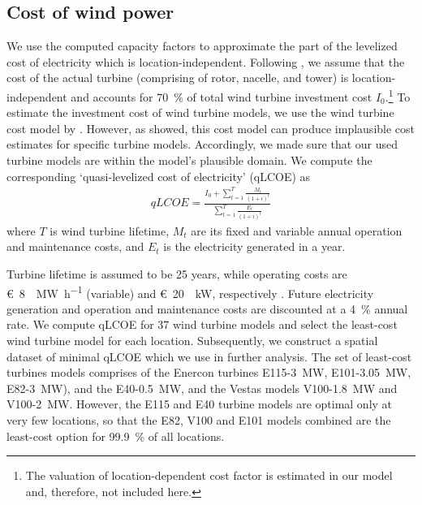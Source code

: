\documentclass[review, a4paper, 12pt, authoryear, times]{elsarticle}
\begin{document}
\subsection{Cost of wind power}\label{app:qlcoe}
We use the computed capacity factors to approximate the part of the levelized cost of electricity which is location-independent.
Following \cite{Eberle2019}, we assume that the cost of the actual turbine (comprising of rotor, nacelle, and tower) is location-independent and accounts for \SI{70}{\percent} of total wind turbine investment cost $I_0$.\footnote{The valuation of location-dependent cost factor is estimated in our model and, therefore, not included here.}
To estimate the investment cost of wind turbine models, we use the wind turbine cost model by \cite{Rinne2018}.
However, as \cite{Kloeckl2022} showed, this cost model can produce implausible cost estimates for specific turbine models.
Accordingly, we made sure that our used turbine models are within the model's plausible domain.
We compute the corresponding `quasi-levelized cost of electricity' (qLCOE) as
\begin{align}
    qLCOE = \frac{I_0 + \sum_{t=1}^{T} \frac{M_t}{(1+i)^t}}{\sum_{t=1}^T \frac{E_t}{(1+i)^t}}
\end{align}
where $T$ is wind turbine lifetime, $M_t$ are its fixed and variable annual operation and maintenance costs, and $E_t$ is the electricity generated in a year.

Turbine lifetime is assumed to be \num{25} years, while operating costs are \SI{8}[\euro]{\per\mega\watt\per\hour} (variable) and \SI{20}[\euro]{\per\kilo\watt}, respectively \citep{Kost2021}.
Future electricity generation and operation and maintenance costs are discounted at a \SI{4}{\percent} annual rate.
We compute qLCOE for \num{37} wind turbine models and select the least-cost wind turbine model for each location.
Subsequently, we construct a spatial dataset of minimal qLCOE which we use in further analysis.
The set of least-cost turbines models comprises of the Enercon turbines E115-\SI{3}{\mega\watt}, E101-\SI{3.05}{\mega\watt}, E82-\SI{3}{\mega\watt}), and the E40-\SI{0.5}{\mega\watt}, and the Vestas models V100-\SI{1.8}{\mega\watt} and V100-\SI{2}{\mega\watt}.
However, the E115 and E40 turbine models are optimal only at very few locations, so that the E82, V100 and E101 models combined are the least-cost option for \SI{99.9}{\percent} of all locations.
\end{document}
